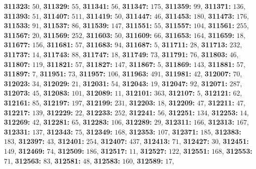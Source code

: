 \textsf{\bfseries 311323:} $50$, \textsf{\bfseries 311329:} $55$, \textsf{\bfseries 311341:} $56$, \textsf{\bfseries 311347:} $175$, \textsf{\bfseries 311359:} $99$, \textsf{\bfseries 311371:} $136$, \textsf{\bfseries 311393:} $51$, \textsf{\bfseries 311407:} $511$, \textsf{\bfseries 311419:} $50$, \textsf{\bfseries 311447:} $46$, \textsf{\bfseries 311453:} $180$, \textsf{\bfseries 311473:} $176$, \textsf{\bfseries 311533:} $91$, \textsf{\bfseries 311537:} $86$, \textsf{\bfseries 311539:} $147$, \textsf{\bfseries 311551:} $55$, \textsf{\bfseries 311557:} $104$, \textsf{\bfseries 311561:} $255$, \textsf{\bfseries 311567:} $20$, \textsf{\bfseries 311569:} $252$, \textsf{\bfseries 311603:} $50$, \textsf{\bfseries 311609:} $66$, \textsf{\bfseries 311653:} $164$, \textsf{\bfseries 311659:} $18$, \textsf{\bfseries 311677:} $156$, \textsf{\bfseries 311681:} $57$, \textsf{\bfseries 311683:} $94$, \textsf{\bfseries 311687:} $5$, \textsf{\bfseries 311711:} $28$, \textsf{\bfseries 311713:} $232$, \textsf{\bfseries 311737:} $14$, \textsf{\bfseries 311743:} $88$, \textsf{\bfseries 311747:} $18$, \textsf{\bfseries 311749:} $73$, \textsf{\bfseries 311791:} $76$, \textsf{\bfseries 311803:} $46$, \textsf{\bfseries 311807:} $119$, \textsf{\bfseries 311821:} $57$, \textsf{\bfseries 311827:} $147$, \textsf{\bfseries 311867:} $5$, \textsf{\bfseries 311869:} $143$, \textsf{\bfseries 311881:} $57$, \textsf{\bfseries 311897:} $7$, \textsf{\bfseries 311951:} $73$, \textsf{\bfseries 311957:} $106$, \textsf{\bfseries 311963:} $491$, \textsf{\bfseries 311981:} $42$, \textsf{\bfseries 312007:} $70$, \textsf{\bfseries 312023:} $34$, \textsf{\bfseries 312029:} $21$, \textsf{\bfseries 312031:} $54$, \textsf{\bfseries 312043:} $19$, \textsf{\bfseries 312047:} $92$, \textsf{\bfseries 312071:} $287$, \textsf{\bfseries 312073:} $45$, \textsf{\bfseries 312083:} $101$, \textsf{\bfseries 312089:} $11$, \textsf{\bfseries 312101:} $363$, \textsf{\bfseries 312107:} $5$, \textsf{\bfseries 312121:} $62$, \textsf{\bfseries 312161:} $85$, \textsf{\bfseries 312197:} $197$, \textsf{\bfseries 312199:} $231$, \textsf{\bfseries 312203:} $18$, \textsf{\bfseries 312209:} $47$, \textsf{\bfseries 312211:} $47$, \textsf{\bfseries 312217:} $139$, \textsf{\bfseries 312229:} $22$, \textsf{\bfseries 312233:} $252$, \textsf{\bfseries 312241:} $56$, \textsf{\bfseries 312251:} $134$, \textsf{\bfseries 312253:} $14$, \textsf{\bfseries 312269:} $42$, \textsf{\bfseries 312281:} $65$, \textsf{\bfseries 312283:} $106$, \textsf{\bfseries 312289:} $29$, \textsf{\bfseries 312311:} $166$, \textsf{\bfseries 312313:} $167$, \textsf{\bfseries 312331:} $137$, \textsf{\bfseries 312343:} $75$, \textsf{\bfseries 312349:} $168$, \textsf{\bfseries 312353:} $107$, \textsf{\bfseries 312371:} $185$, \textsf{\bfseries 312383:} $183$, \textsf{\bfseries 312397:} $43$, \textsf{\bfseries 312401:} $254$, \textsf{\bfseries 312407:} $437$, \textsf{\bfseries 312413:} $71$, \textsf{\bfseries 312427:} $30$, \textsf{\bfseries 312451:} $149$, \textsf{\bfseries 312469:} $74$, \textsf{\bfseries 312509:} $186$, \textsf{\bfseries 312517:} $11$, \textsf{\bfseries 312527:} $122$, \textsf{\bfseries 312551:} $168$, \textsf{\bfseries 312553:} $71$, \textsf{\bfseries 312563:} $83$, \textsf{\bfseries 312581:} $48$, \textsf{\bfseries 312583:} $160$, \textsf{\bfseries 312589:} $17$, 
